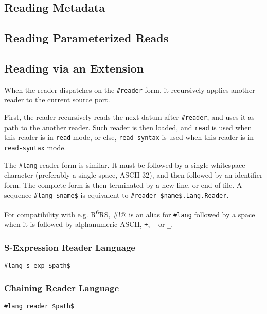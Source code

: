 \subsection{Reading Metadata}
\label{subsec:aml-base-lang-reader-metadata}





\subsection{Reading Parameterized Reads}
\label{subsec:aml-base-lang-reader-parameterized-reads}





\subsection{Reading via an Extension}
\label{subsec:aml-base-lang-reader-extension}

When the reader dispatches on the \lstinline!#reader! form, it recursively applies another reader to the current source port. 


First, the reader recursively reads the next datum after \lstinline!#reader!, and uses it as path to the another reader. Such reader is then loaded, and \lstinline!read! is used when this reader is in \lstinline!read! mode, or else, \lstinline!read-syntax! is used when this reader is in \lstinline!read-syntax! mode.

The \lstinline!#lang! reader form is similar. It must be followed by a single whitespace character (preferably a single space, ASCII 32), and then followed by an identifier form. The complete form is then terminated by a new line, or end-of-file. A sequence \lstinline!#lang $name$! is equivalent to \lstinline!#reader $name$.Lang.Reader!. 


For compatibility with e.g. R\textsuperscript{6}RS, \lstinline@#!@ is an alias for \lstinline!#lang! followed by a space when it is followed by alphanumeric ASCII, \lstinline!+!, \lstinline!-! or \lstinline!_!. 





\subsubsection{S-Expression Reader Language}

\begin{lstlisting}
#lang s-exp $path$
\end{lstlisting}





\subsubsection{Chaining Reader Language}

\begin{lstlisting}
#lang reader $path$
\end{lstlisting}






